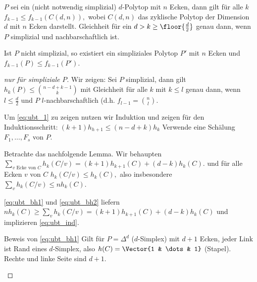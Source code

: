 \begin{thm}
    $P$ sei ein (nicht notwendig simplizial) $d$-Polytop mit $n$ Ecken, dann gilt für alle $k$
    \begin{math}
        f_{k-1} \le f_{k-1}(C(d,n)),
    \end{math}
    wobei $C(d,n)$ das zyklische Polytop der Dimension $d$ mit $n$ Ecken darstellt.
    Gleichheit für ein $d > k \ge \floor{\frac{d}{2}}$ genau dann, wenn $P$ simplizial und nachbarschaftlich ist.

    \begin{note}
        Ist $P$ nicht simplizial, so existiert ein simpliziales Polytop $P'$ mit $n$ Ecken und $f_{k-1}(P) \le f_{k-1}(P')$.
    \end{note}
    \begin{proof}[nur für simpliziale $P$]
        Wir zeigen: Sei $P$ simplizial, dann gilt
        \begin{math} \label{eq:ubt_1}
            h_k(P) \le \binom{n-d+k-1}{k}
        \end{math}
        mit Gleichheit für alle $k$ mit $k \le l$ genau dann, wenn $l \le \frac{d}{2}$ und $P$ $l$-nachbarschaftlich (d.h. $f_{l-1} = \binom{n}{l}$.

        Um \eqref{eq:ubt_1} zu zeigen nutzen wir Induktion und zeigen für den Induktionsschritt:
        \begin{math} \label{eq:ubt_ind}
            (k+1) h_{h+1} \le (n-d+k) h_k
        \end{math}
        Verwende eine Schälung $F_1, \dotsc, F_s$ von $P$.

        Betrachte das nachfolgende Lemma.
        Wir behaupten
        \begin{math}[numbered=multiple] \label{eq:ubt_bh1}
            \sum_{\text{$v$ Ecke von $C$}} h_k(C / v) = (k+1) h_{k+1}(C) + (d-k) h_k(C). \tag{B1}
        \end{math}
        und für alle Ecken $v$ von $C$
        \begin{math}[numbered=multiple] \label{eq:ubt_bh2}
            h_k(C/v) \le h_k(C), \tag{B2}
        \end{math}
        also insbesondere $\sum_{v} h_k(C/v) \le n h_k(C)$.

        \eqref{eq:ubt_bh1} und \eqref{eq:ubt_bh2} liefern
        \begin{math}
            n h_k(C)
            \ge \sum_{v} h_k(C/v)
            = (k+1) h_{k+1}(C) + (d-k) h_k(C)
        \end{math}
        und implizieren \eqref{eq:ubt_ind}.
        \begin{seg}{Beweis von \eqref{eq:ubt_bh1}}
            Gilt für $P = \Delta^d$ ($d$-Simplex) mit $d+1$ Ecken, jeder Link ist Rand eines $d$-Simplex, also $h(C) = \Vector{1 & \dots & 1}$ (Stapel).
            Rechte und linke Seite sind $d+1$.


\end{seg}
\end{proof}
\end{thm}
